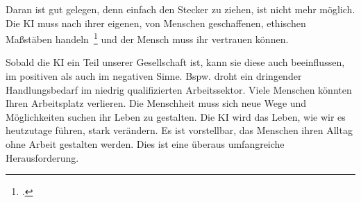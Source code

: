 Daran ist gut gelegen, denn einfach den Stecker zu ziehen, ist nicht mehr möglich. Die \ac{KI} muss nach ihrer eigenen, von Menschen geschaffenen, 
ethischen Maßstäben handeln~\footcite[\vglf][]{Wittpahl.2018} und der Mensch muss ihr vertrauen können.


Sobald die \ac{KI} ein Teil unserer Gesellschaft ist, kann sie diese auch beeinflussen, im positiven als auch im negativen Sinne. Bspw. droht ein dringender Handlungsbedarf
im niedrig qualifizierten Arbeitssektor. Viele Menschen könnten Ihren Arbeitsplatz verlieren. Die Menschheit muss sich neue Wege und Möglichkeiten suchen ihr Leben zu 
gestalten. Die \ac{KI} wird das Leben, wie wir es heutzutage führen, stark verändern. Es ist vorstellbar, das Menschen ihren Alltag ohne Arbeit gestalten werden. Dies ist eine
überaus umfangreiche Herausforderung.

